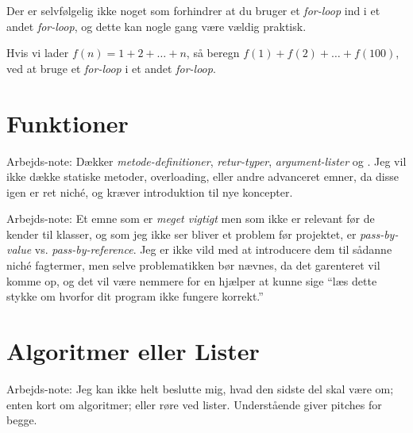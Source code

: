 	\begin{exercise}
		Der er selvfølgelig ikke noget som forhindrer at du bruger et
		\emph{for-loop} ind i et andet \emph{for-loop}, og dette kan nogle gang
		være vældig praktisk.

		Hvis vi lader \(f(n) = 1+2+\dots+n\), så beregn
		\(f(1)+f(2)+\dots+f(100)\), ved at bruge et \emph{for-loop} i et andet
		\emph{for-loop}.

	\end{exercise}


\blindtext

\section{Funktioner}

	\begin{remark}  Arbejds-note:
		Dækker \emph{metode-definitioner}, \emph{retur-typer},
		\emph{argument-lister} og .
		Jeg vil ikke dække statiske metoder, overloading, eller andre advanceret
		emner, da disse igen er ret niché, og kræver introduktion til nye
		koncepter.
	\end{remark}

	\begin{remark}  Arbejds-note:
		Et emne som er \emph{meget vigtigt} men som ikke er relevant før de
		kender til klasser, og som jeg ikke ser bliver et problem før projektet,
		er \emph{pass-by-value} vs. \emph{pass-by-reference}.
		Jeg er ikke vild med at introducere dem til sådanne niché fagtermer, men
		selve problematikken bør nævnes, da det garenteret vil komme op, og det
		vil være nemmere for en hjælper at kunne sige ``læs dette stykke om
		hvorfor dit program ikke fungere korrekt.''
	\end{remark}

\blindtext

\section{Algoritmer eller Lister}

	\begin{remark}  Arbejds-note:
		Jeg kan ikke helt beslutte mig, hvad den sidste del skal være om; enten
		kort om algoritmer; eller røre ved lister.
		Understående giver pitches for begge.
	\end{remark}

